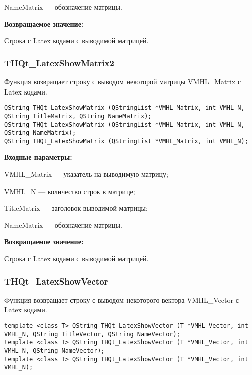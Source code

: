 \documentclass[a4paper,12pt]{article}
\begin{document}
    NameMatrix --- обозначение матрицы.
	
\textbf{Возвращаемое значение:}

Строка с Latex кодами с выводимой матрицей.


\subsubsection{THQt\_LatexShowMatrix2}\label{THQt_LatexShowMatrix2}

Функция возвращает строку с выводом некоторой матрицы VMHL\_Matrix с Latex кодами.


\begin{lstlisting}[label=code_syntax_THQt_LatexShowMatrix2,caption=Синтаксис]
QString THQt_LatexShowMatrix (QStringList *VMHL_Matrix, int VMHL_N, QString TitleMatrix, QString NameMatrix);
QString THQt_LatexShowMatrix (QStringList *VMHL_Matrix, int VMHL_N, QString NameMatrix);
QString THQt_LatexShowMatrix (QStringList *VMHL_Matrix, int VMHL_N);

\end{lstlisting}

\textbf{Входные параметры:}

    VMHL\_Matrix --- указатель на выводимую матрицу;
 
    VMHL\_N --- количество строк в матрице;
 
    TitleMatrix --- заголовок выводимой матрицы;
 
    NameMatrix --- обозначение матрицы.
	
\textbf{Возвращаемое значение:}

Строка с Latex кодами с выводимой матрицей.


\subsubsection{THQt\_LatexShowVector}\label{THQt_LatexShowVector}

Функция возвращает строку с выводом некоторого вектора VMHL\_Vector с Latex кодами.


\begin{lstlisting}[label=code_syntax_THQt_LatexShowVector,caption=Синтаксис]
template <class T> QString THQt_LatexShowVector (T *VMHL_Vector, int VMHL_N, QString TitleVector, QString NameVector);
template <class T> QString THQt_LatexShowVector (T *VMHL_Vector, int VMHL_N, QString NameVector);
template <class T> QString THQt_LatexShowVector (T *VMHL_Vector, int VMHL_N);

\end{lstlisting}
\end{document}
